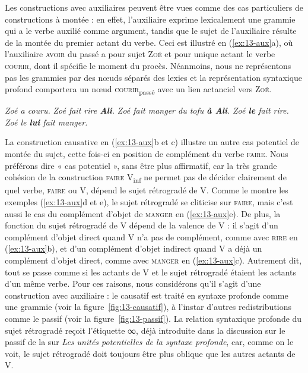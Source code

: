 Les constructions avec auxiliaires peuvent être vues comme des cas particuliers de constructions à montée : en effet, l’auxiliaire exprime lexicalement une grammie qui a le verbe auxilié comme argument, tandis que le sujet de l’auxiliaire résulte de la montée du premier actant du verbe. Ceci est illustré en (\ref{ex:13-aux}a), où l’auxiliaire \textsc{avoir} du passé a pour sujet \textsc{Zoé} et pour unique actant le verbe \textsc{courir}, dont il spécifie le moment du procès. Néanmoins, nous ne représentons pas les grammies par des nœuds séparés des lexies et la représentation syntaxique profond comportera un  nœud \textsc{courir}\textsubscript{passé} avec un lien actanciel vers \textsc{Zoé}.\largerpage

\ea\label{ex:13-aux}
\ea \textit{Zoé a couru.}
\ex \textit{Zoé fait rire \textbf{Ali}.}
\ex \textit{Zoé fait manger du tofu \textbf{à Ali}.}
\ex \textit{Zoé \textbf{le} fait rire.}
\ex \textit{Zoé le \textbf{lui} fait manger.}\z\z

La construction causative en (\ref{ex:13-aux}b et c) illustre un autre cas potentiel de montée du sujet, cette fois-ci en position de complément du verbe \textsc{faire}. Nous préférons dire « cas potentiel », sans être plus affirmatif, car la très grande cohésion de la construction \textsc{faire} V\textsubscript{inf} ne permet pas de décider clairement de quel verbe, \textsc{faire} ou V, dépend le sujet rétrogradé de V. Comme le montre les exemples (\ref{ex:13-aux}d et e), le sujet rétrogradé se cliticise sur \textsc{faire}, mais c’est aussi le cas du complément d’objet de \textsc{manger} en (\ref{ex:13-aux}e). De plus, la fonction du sujet rétrogradé de V dépend de la valence de V : il s’agit d’un complément d’objet direct quand V n’a pas de complément, comme avec \textsc{rire} en (\ref{ex:13-aux}b), et d’un complément d’objet indirect quand V a déjà un complément d’objet direct, comme avec \textsc{manger} en (\ref{ex:13-aux}c). Autrement dit, tout se passe comme si les actants de V et le sujet rétrogradé étaient les actants d'un même verbe. Pour ces raisons, nous considérons qu’il s’agit d’une construction avec auxiliaire : le causatif est traité en syntaxe profonde comme une grammie (voir la figure~\ref{fig:13-causatif}), à l’instar d’autres redistributions comme le passif (voir la figure~\ref{fig:13-passif}). La relation syntaxique profonde du sujet rétrogradé reçoit l’étiquette ∞, déjà introduite dans la discussion sur le passif de la  sur \textit{Les unités potentielles de la syntaxe profonde}, car, comme on le voit, le sujet rétrogradé doit toujours être plus oblique que les autres actants de V.

